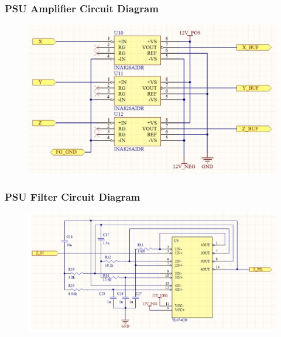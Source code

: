 \documentclass{TheMartianReport}
\begin{document}
\pagebreak

\subsubsection{PSU Amplifier Circuit Diagram}
\begin{figure}[h]
	\centering
	\includegraphics[scale=0.5]{PSU_amp_diagram}
	\caption{}
	\label{fig:PSUamp}
\end{figure}

\subsubsection{PSU Filter Circuit Diagram}
\begin{figure}[h]
	\centering
	\includegraphics[scale=0.5]{PSU_filter_diagram}
	\caption{}
	\label{fig:PSUfilter}
\end{figure}

\pagebreak
\end{document}
